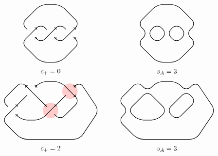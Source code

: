 \documentclass[12pt]{amsart}
\theoremstyle{definition}
\theoremstyle{remark}
\numberwithin{equation}{section}
\begin{document}
\begin{figure}[h]
    \[\begin{tikzpicture}[thick]
    \begin{scope}[rounded corners = 3mm, xshift=1cm]
        \draw (2.7,.3) -- (3,0) -- (2,-1) -- (1,-1) -- (0,0) -- (1,1) -- (1.3,.7);
        \draw (0.7,.3) -- (1,0) -- (2,1) -- (2.3,.7);
        \draw (1.7,.3) -- (2,0) -- (3,1) -- (2,2) -- (1,2) -- (0,1) -- (0.3,0.7);
        \foreach \i in {0,1,2} {
            \draw[->] (\i+0.7,0.3) -- (\i+0.8,0.2);
            \draw[->] (\i+0.7,0.7) -- (\i+0.8,0.8);
            }
        \draw (1.5,-1.5) node{$c_+=0$};
    \end{scope}
    
    \begin{scope}[rounded corners = 3mm, xshift = 7cm]
        \draw (1.5,2) -- (1,2) -- (0,1) -- (.5,.5) -- (0,0) -- (1,-1) -- (2,-1) -- (3,0) -- (2.5,.5) -- (3,1) -- (2,2) -- (1.5,2);
        \draw (.75,.75) -- (1,1) -- (1.5,.5) -- (1,0) -- (.5,.5) -- (.75,.75);
        \draw[xshift = 1 cm] (.75,.75) -- (1,1) -- (1.5,.5) -- (1,0) -- (.5,.5) -- (.75,.75);
        \draw (1.5,-1.5) node{$s_A=3$};
    \end{scope}

    \begin{scope}[rounded corners = 3mm, yshift=-4cm]
         \fill[red!20!white] (2.5,.5) circle (.4cm);
        \fill[red!20!white] (3.5,1.5) circle (.4cm);
        \draw (3.7,1.7) -- (4,2) -- (5,0.5) -- (4,-1) -- (1,-1) -- (0,0) -- (1.3,1.3);
        \draw (1.7,1.7) -- (2,2) -- (3,2) -- (4,1) -- (3,0) -- (2.7,.3);
        \draw (2.3,.7) -- (1,2) -- (0,1) -- (.3,.7);
        \draw (.7,.3) -- (1,0) -- (2,0) -- (3.3,1.3);

        \draw[->] (.7,.3) -- (.8,.2);
        \draw[->] (.7,.7) -- (.8,.8);
        \draw[->] (1.3,1.7) -- (1.2,1.8);
        \draw[->] (1.7,1.7) -- (1.8,1.8);
        \draw[->] (2.3,.7) -- (2.2,.8);
        \draw[->] (2.7,.7) -- (2.8,.8);
        \draw[->] (3.7,1.3) -- (3.8,1.2);
        \draw[->] (3.7,1.7) -- (3.8,1.8);
       
        \draw (2.5,-1.5) node{$c_+=2$};

       
    \end{scope}
    
    \begin{scope}[rounded corners = 3mm, xshift = 6cm, yshift=-4cm]
        \draw (2,-1) -- (1,-1) -- (0,0) -- (.5,.5) -- (0,1) -- (1,2) -- (1.5,1.5) -- (2,2) -- (3,2) -- (3.5,1.5) -- (4,2) -- (5,0.5) -- (4,-1)-- (2,-1);
        \draw (.75,.75) -- (1.5,1.5) -- (2.5,.5) -- (2,0) -- (1,0) -- (.5,.5) -- (.75,.75);
        \draw (2.75,.75) -- (3.5,1.5) -- (4,1) -- (3,0) -- (2.5,.5) -- (2.75,.75);
        \draw (2.5,-1.5) node{$s_A=3$};
    \end{scope}



\end{tikzpicture}\]
\end{figure}
\end{document}
